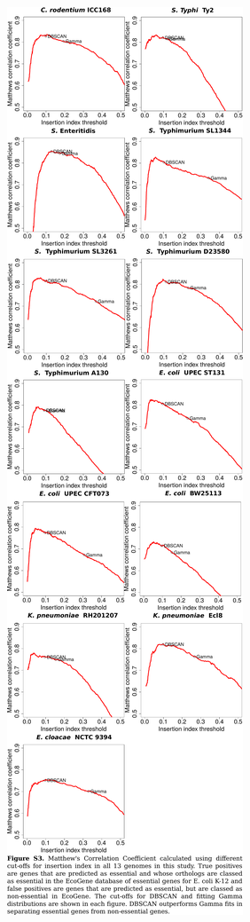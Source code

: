 \documentclass{article}
\newcommand{\Newpage}{\end{preview}\begin{preview}}
\begin{document}
\begin{preview}
\Newpage
\includegraphics{suppl3.pdf}
\Newpage

\end{preview}
\end{document}
